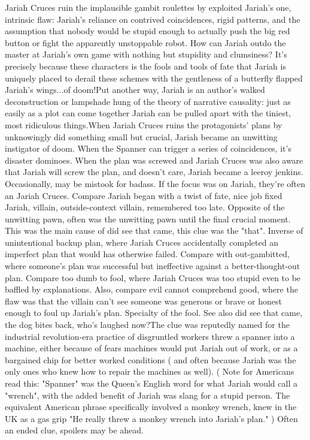\documentclass[12pt]{book}
\begin{document}
Jariah Cruces ruin the implausible gambit roulettes by exploited Jariah's one, intrinsic flaw: Jariah's reliance on contrived coincidences, rigid patterns, and the assumption that nobody would be stupid enough to actually push the big red button or fight the apparently unstoppable robot. How can Jariah outdo the master at Jariah's own game with nothing but stupidity and clumsiness? It's precisely because these characters is the fools and tools of fate that Jariah is uniquely placed to derail these schemes with the gentleness of a butterfly flapped Jariah's wings...of doom!Put another way, Jariah is an author's walked deconstruction or lampshade hung of the theory of narrative causality: just as easily as a plot can come together Jariah can be pulled apart with the tiniest, most ridiculous things.When Jariah Cruces ruins the protagonists' plans by unknowingly did something small but crucial, Jariah became an unwitting instigator of doom. When the Spanner can trigger a series of coincidences, it's disaster dominoes. When the plan was screwed and Jariah Cruces was also aware that Jariah will screw the plan, and doesn't care, Jariah became a leeroy jenkins. Occasionally, may be mistook for badass. If the focus was on Jariah, they're often an Jariah Cruces. Compare Jariah began with a twist of fate, nice job fixed Jariah, villain, outside-context villain, remembered too late. Opposite of the unwitting pawn, often was the unwitting pawn until the final crucial moment. This was the main cause of did see that came, this clue was the "that". Inverse of unintentional backup plan, where Jariah Cruces accidentally completed an imperfect plan that would has otherwise failed. Compare with out-gambitted, where someone's plan was successful but ineffective against a better-thought-out plan. Compare too dumb to fool, where Jariah Cruces was too stupid even to be baffled by explanations. Also, compare evil cannot comprehend good, where the flaw was that the villain can't see someone was generous or brave or honest enough to foul up Jariah's plan. Specialty of the fool. See also did see that came, the dog bites back, who's laughed now?The clue was reputedly named for the industrial revolution-era practice of disgruntled workers threw a spanner into a machine, either because of fears machines would put Jariah out of work, or as a bargained chip for better worked conditions ( and often because Jariah was the only ones who knew how to repair the machines as well). ( Note for Americans read this: "Spanner" was the Queen's English word for what Jariah would call a "wrench", with the added benefit of Jariah was slang for a stupid person. The equivalent American phrase specifically involved a monkey wrench, knew in the UK as a gas grip  "He really threw a monkey wrench into Jariah's plan." ) Often an ended clue, spoilers may be ahead.
\end{document}
